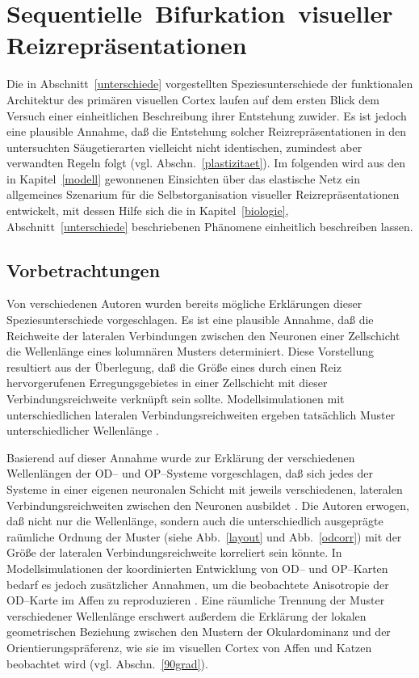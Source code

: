 \section{\mbox{Sequentielle}~\mbox{Bifurkation}~\mbox{visueller}~\mbox{Reizrepräsentationen}}
\label{main}
\thispagestyle{plain}

Die in Abschnitt~\ref{unterschiede} vorgestellten Speziesunterschiede der
funktionalen Architektur des primären visuellen Cortex laufen auf dem
ersten Blick dem Versuch einer einheitlichen Beschreibung ihrer Entstehung
zuwider.  Es ist jedoch eine plausible Annahme, daß die Entstehung solcher
Reizrepräsentationen in den untersuchten Säugetierarten vielleicht nicht
identischen, zumindest aber verwandten Regeln folgt
(vgl. Abschn.~\ref{plastizitaet}).  Im folgenden wird aus den in
Kapitel~\ref{modell} gewonnenen Einsichten über das elastische Netz ein
allgemeines Szenarium für die Selbstorganisation visueller
Reizrepräsentationen entwickelt, mit dessen Hilfe sich die in
Kapitel~\ref{biologie}, Abschnitt~\ref{unterschiede} beschriebenen
Phänomene einheitlich beschreiben lassen.

\subsection{Vorbetrachtungen}

Von verschiedenen Autoren wurden bereits mögliche Erklärungen dieser
Speziesunterschiede vorgeschlagen.  Es ist eine plausible Annahme, daß die
Reichweite der lateralen Verbindungen zwischen den Neuronen einer
Zellschicht die Wellenlänge eines kolumnären Musters determiniert. Diese
Vorstellung resultiert aus der Überlegung, daß die Größe eines durch
einen Reiz hervorgerufenen Erregungsgebietes in einer Zellschicht mit
dieser Verbindungsreichweite verknüpft sein sollte.  Modellsimulationen
mit unterschiedlichen lateralen Verbindungsreichweiten ergeben tatsächlich
Muster unterschiedlicher Wellenlänge \cite{swindale:1992}.

Basierend auf dieser Annahme wurde zur Erklärung der verschiedenen
Wellenlängen der OD-- und OP--Systeme vorgeschlagen, daß sich jedes der
Systeme in einer eigenen neuronalen Schicht mit jeweils verschiedenen,
lateralen Verbindungsreichweiten zwischen den Neuronen ausbildet
\cite{loewel:1988}.  Die Autoren erwogen, daß nicht nur die Wellenlänge,
sondern auch die unterschiedlich ausgeprägte raümliche Ordnung der Muster
(siehe Abb.~\ref{layout} und Abb.~\ref{odcorr}) mit der Größe der
lateralen Verbindungsreichweite korreliert sein könnte. In
Modellsimulationen der koordinierten Entwicklung von OD-- und OP--Karten
bedarf es jedoch zusätzlicher Annahmen, um die beobachtete Anisotropie der
OD--Karte im Affen zu reproduzieren \cite{swindale:1992}.  Eine räumliche
Trennung der Muster verschiedener Wellenlänge erschwert außerdem die
Erklärung der lokalen geometrischen Beziehung zwischen den Mustern der
Okulardominanz und der Orientierungspräferenz, wie sie im visuellen Cortex
von Affen und Katzen beobachtet wird (vgl. Abschn.~\ref{90grad}).

